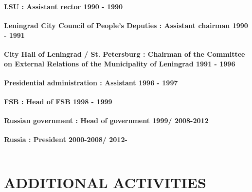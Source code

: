 \documentclass[margin, line]{res}
\begin{document}
\begin{resume}
\textbf{LSU : Assistant rector
 \hfill{1990 - 1990}\\}
 \\

\textbf{Leningrad City Council of People's Deputies : Assistant chairman
 \hfill{1990 - 1991}\\}
 \\

\textbf{City Hall of Leningrad / St. Petersburg : 
Chairman of the Committee on External Relations of the Municipality of Leningrad
 \hfill{1991 - 1996}\\}
 \\

\textbf{Presidential administration : Assistant
 \hfill{1996 - 1997}\\}
 \\

\textbf{FSB : Head of FSB
 \hfill{1998 - 1999}\\}
 \\

\textbf{Russian government : Head of government
 \hfill{1999/ 2008-2012}\\} \\

\textbf{Russia : President
 \hfill{2000-2008/ 2012-}\\} \\

\section{ADDITIONAL ACTIVITIES}

\end{resume}
\(\)
\end{document}
